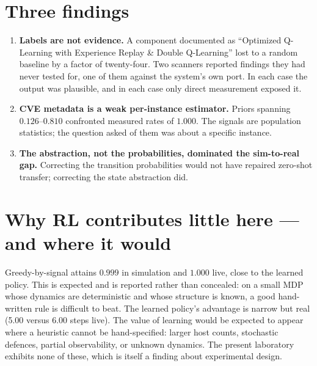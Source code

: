 \documentclass[11pt,a4paper]{report}
\begin{document}
\section{Three findings}
\begin{enumerate}[leftmargin=*]
  \item \textbf{Labels are not evidence.} A component documented as
  ``Optimized Q-Learning with Experience Replay \& Double Q-Learning'' lost to a
  random baseline by a factor of twenty-four. Two scanners reported findings they
  had never tested for, one of them against the system's own port. In each case
  the output was plausible, and in each case only direct measurement exposed it.
  \item \textbf{CVE metadata is a weak per-instance estimator.} Priors spanning
  $0.126$--$0.810$ confronted measured rates of $1.000$. The signals are
  population statistics; the question asked of them was about a specific
  instance.
  \item \textbf{The abstraction, not the probabilities, dominated the
  sim-to-real gap.} Correcting the transition probabilities would not have
  repaired zero-shot transfer; correcting the state abstraction did.
\end{enumerate}

\section{Why RL contributes little here --- and where it would}
Greedy-by-signal attains $0.999$ in simulation and $1.000$ live, close to the
learned policy. This is expected and is reported rather than concealed: on a
small MDP whose dynamics are deterministic and whose structure is known, a good
hand-written rule is difficult to beat. The learned policy's advantage is
narrow but real (5.00 versus 6.00 steps live). The value of learning would be
expected to appear where a heuristic cannot be hand-specified: larger host
counts, stochastic defences, partial observability, or unknown dynamics. The
present laboratory exhibits none of these, which is itself a finding about
experimental design.
\end{document}
